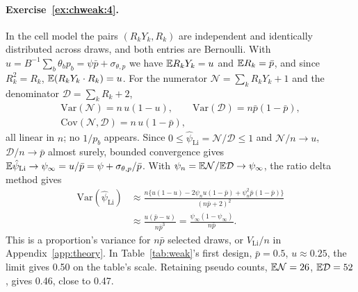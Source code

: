 \paragraph{Exercise~\ref{ex:chweak:4}.} In the cell model the pairs $(R_kY_k, R_k)$ are independent and identically distributed across draws, and both entries are Bernoulli. With $u = B^{-1}\sum_b\theta_bp_b = \psi\bar p + \sigma_{\theta,p}$ we have $\mathbb{E} R_kY_k = u$ and $\mathbb{E} R_k = \bar p$, and since $R_k^2 = R_k$, $\mathbb{E}(R_kY_k \cdot R_k) = u$. For the numerator $\mathcal{N} = \sum_k R_kY_k + 1$ and the denominator $\mathcal{D} = \sum_k R_k + 2$,
\[
\begin{gathered}
\mathrm{Var}(\mathcal{N}) = n\,u(1 - u), \qquad \mathrm{Var}(\mathcal{D}) = n\bar p(1 - \bar p), \\
\mathrm{Cov}(\mathcal{N}, \mathcal{D}) = n\,u(1 - \bar p),
\end{gathered}
\]
all linear in $n$; no $1/p_b$ appears. Since $0\le\hat\psi_{\mathrm{Li}}=\mathcal N/\mathcal D\le1$ and $\mathcal N/n\to u$, $\mathcal D/n\to\bar p$ almost surely, bounded convergence gives $\mathbb{E}\hat\psi_{\mathrm{Li}}\to\psi_\infty=u/\bar p=\psi+\sigma_{\theta,p}/\bar p$. With $\psi_n=\mathbb{E}\mathcal N/\mathbb{E}\mathcal D\to\psi_\infty$, the ratio delta method gives
\[
\begin{split}
\mathrm{Var}(\hat\psi_{\mathrm{Li}})&\approx\frac{n\{u(1-u)-2\psi_nu(1-\bar p)+\psi_n^2\bar p(1-\bar p)\}}{(n\bar p+2)^2}\\
&\approx\frac{u(\bar p-u)}{n\bar p^3}=\frac{\psi_\infty(1-\psi_\infty)}{n\bar p}.
\end{split}
\]
This is a proportion's variance for $n\bar p$ selected draws, or $V_{\mathrm{Li}}/n$ in Appendix~\ref{app:theory}. In Table~\ref{tab:weak}'s first design, $\bar p=0.5$, $u\approx0.25$, the limit gives 0.50 on the table's scale. Retaining pseudo counts, $\mathbb{E}\mathcal N=26$, $\mathbb{E}\mathcal D=52$, gives 0.46, close to 0.47.

